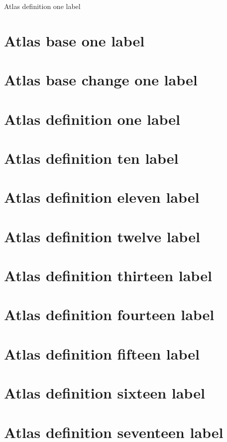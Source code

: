 \documentclass[11pt]{article}
\theoremstyle{definition}
\begin{document}
\begin{center}
{\LARGE Atlas definition one label}
\end{center}
\section{Atlas base one label}
\label{ll:labels:atlas-a1}
\section{Atlas base change one label}
\label{ll:labels:atlas-bc1}
\section{Atlas definition one label}
\label{ll:labels:atlas-d1}
\section{Atlas definition ten label}
\label{ll:labels:atlas-d10}
\section{Atlas definition eleven label}
\label{ll:labels:atlas-d11}
\section{Atlas definition twelve label}
\label{ll:labels:atlas-d12}
\section{Atlas definition thirteen label}
\label{ll:labels:atlas-d13}
\section{Atlas definition fourteen label}
\label{ll:labels:atlas-d14}
\section{Atlas definition fifteen label}
\label{ll:labels:atlas-d15}
\section{Atlas definition sixteen label}
\label{ll:labels:atlas-d16}
\section{Atlas definition seventeen label}
\label{ll:labels:atlas-d17}
\end{document}
